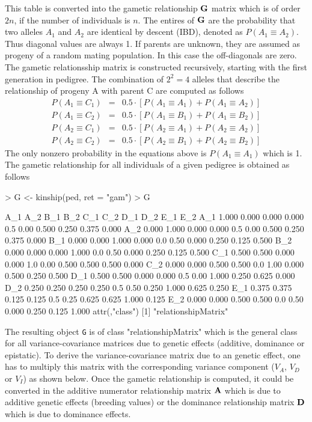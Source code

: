 \documentclass[a4paper,11pt]{article}
\begin{document}
This table is converted into the gametic relationship $\bf G$ matrix which is of order $2n$, if the number of individuals is $n$. The entires of $\bf G$ are the probability that two alleles $A_1$ and $A_2$ are identical by
descent (IBD), denoted as $P(A_1 \equiv A_2)$. Thus diagonal values are always 1. If parents are unknown, they are assumed as progeny of a random mating population. In this case the off-diagonals are zero. The gametic relationsship matrix is constructed recursively, starting with the first 
generation in pedigree. 
The combination of $2^2=4$ alleles that describe the relationship of progeny A with parent C are computed as follows
\begin{eqnarray*} 
P(A_1 \equiv C_1) &=& 0.5 \cdot \left[P(A_1 \equiv A_1) + P(A_1 \equiv A_2)\right]  \\
P(A_1 \equiv C_2) &=& 0.5 \cdot \left[P(A_1 \equiv B_1) + P(A_1 \equiv B_2)\right]  \\
P(A_2 \equiv C_1) &=& 0.5 \cdot \left[P(A_2 \equiv A_1) + P(A_2 \equiv A_2)\right]  \\
P(A_2 \equiv C_2) &=& 0.5 \cdot \left[P(A_2 \equiv B_1) + P(A_2 \equiv B_2)\right]   
\end{eqnarray*}
The only nonzero probability in the equations above is $P(A_1 \equiv A_1)$ which is 1. The gametic relationship for all individuals of a given pedigree is obtained as follows
\begin{Schunk}
\begin{Sinput}
> G <- kinship(ped, ret = "gam")
> G
\end{Sinput}
\begin{Soutput}
      A_1   A_2   B_1   B_2 C_1  C_2   D_1   D_2   E_1   E_2
A_1 1.000 0.000 0.000 0.000 0.5 0.00 0.500 0.250 0.375 0.000
A_2 0.000 1.000 0.000 0.000 0.5 0.00 0.500 0.250 0.375 0.000
B_1 0.000 0.000 1.000 0.000 0.0 0.50 0.000 0.250 0.125 0.500
B_2 0.000 0.000 0.000 1.000 0.0 0.50 0.000 0.250 0.125 0.500
C_1 0.500 0.500 0.000 0.000 1.0 0.00 0.500 0.500 0.500 0.000
C_2 0.000 0.000 0.500 0.500 0.0 1.00 0.000 0.500 0.250 0.500
D_1 0.500 0.500 0.000 0.000 0.5 0.00 1.000 0.250 0.625 0.000
D_2 0.250 0.250 0.250 0.250 0.5 0.50 0.250 1.000 0.625 0.250
E_1 0.375 0.375 0.125 0.125 0.5 0.25 0.625 0.625 1.000 0.125
E_2 0.000 0.000 0.500 0.500 0.0 0.50 0.000 0.250 0.125 1.000
attr(,"class")
[1] "relationshipMatrix"
\end{Soutput}
\end{Schunk}
The resulting object \texttt{G} is of class "relationshipMatrix" which is the general class for all variance-covariance matrices due to genetic effects (additive, dominance or epistatic). To derive the variance-covariance matrix due to an genetic effect,
one has to multiply this matrix with the corresponding variance component ($V_A$, $V_D$ or $V_I$) as shown below. Once the gametic relationship is computed, it could be converted in the additive numerator relationship matrix $\bf A$ which is due to additive genetic effects (breeding values) or the dominance relationship matrix $\bf D$ which is due to dominance effects.  
\end{document}
